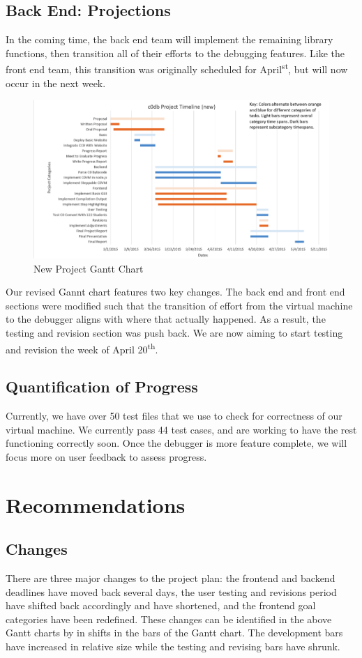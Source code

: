 \documentclass[11pt]{article}
\begin{document}
\subsection{Back End: Projections}
In the coming time, the back end team will implement the remaining library
functions, then transition all of their efforts to the debugging features. Like
the front end team, this transition was originally scheduled for
April\textsuperscript{st}, but will now occur in the next week.
\par
\begin{figure}[h]
  \includegraphics[width=\linewidth]{new-gantt.png}
  \caption{New Project Gantt Chart}
  \label{fig:new-gantt}
\end{figure}
Our revised Gannt chart features two key changes. The back end and front end
sections were modified such that the transition of effort from the virtual
machine to the debugger aligns with where that actually happened. As a result,
the testing and revision section was push back. We are now aiming to start
testing and revision the week of April 20\textsuperscript{th}.
\subsection{Quantification of Progress}
Currently, we have over 50 test files that we use to check for correctness of
our virtual machine. We currently pass 44 test cases, and are working to have
the rest functioning correctly soon. Once the debugger is more feature complete,
we will focus more on user feedback to assess progress.
\section{Recommendations}
\subsection{Changes}
There are three major changes to the project plan: the frontend and backend
deadlines have moved back several days, the user testing and revisions period
have shifted back accordingly and have shortened, and the frontend goal
categories have been redefined. These changes can be identified in the above
Gantt charts by in shifts in the bars of the Gantt chart. The development bars
have increased in relative size while the testing and revising bars have shrunk.
\end{document}
